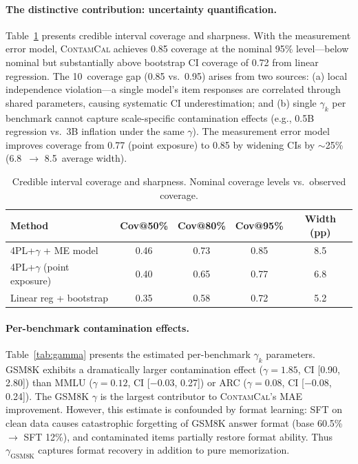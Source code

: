 \documentclass[11pt,a4paper]{article}
\newcommand{\method}{\textsc{ContamCal}}
\newcommand{\pp}{\,\text{pp}}
\begin{document}
\paragraph{The distinctive contribution: uncertainty quantification.}
Table~\ref{tab:coverage} presents credible interval coverage and sharpness. With the measurement error model, \method{} achieves 0.85 coverage at the nominal 95\% level---below nominal but substantially above bootstrap CI coverage of 0.72 from linear regression. The 10\pp{} coverage gap (0.85 vs.\ 0.95) arises from two sources: (a) local independence violation---a single model's item responses are correlated through shared parameters, causing systematic CI underestimation; and (b) single $\gamma_k$ per benchmark cannot capture scale-specific contamination effects (e.g., 0.5B regression vs.\ 3B inflation under the same $\gamma$). The measurement error model improves coverage from 0.77 (point exposure) to 0.85 by widening CIs by $\sim$25\% (6.8\pp{} $\to$ 8.5\pp{} average width).

\begin{table}[t]
\centering
\caption{Credible interval coverage and sharpness. Nominal coverage levels vs.\ observed coverage.}
\label{tab:coverage}
\small
\begin{tabular}{lcccc}
\toprule
\textbf{Method} & \textbf{Cov@50\%} & \textbf{Cov@80\%} & \textbf{Cov@95\%} & \textbf{Width (pp)} \\
\midrule
4PL+$\gamma$ + ME model        & 0.46 & 0.73 & 0.85 & 8.5 \\
4PL+$\gamma$ (point exposure)  & 0.40 & 0.65 & 0.77 & 6.8 \\
Linear reg + bootstrap          & 0.35 & 0.58 & 0.72 & 5.2 \\
\bottomrule
\end{tabular}
\end{table}

\paragraph{Per-benchmark contamination effects.}
Table~\ref{tab:gamma} presents the estimated per-benchmark $\gamma_k$ parameters. GSM8K exhibits a dramatically larger contamination effect ($\gamma = 1.85$, CI [0.90, 2.80]) than MMLU ($\gamma = 0.12$, CI [$-0.03$, 0.27]) or ARC ($\gamma = 0.08$, CI [$-0.08$, 0.24]). The GSM8K $\gamma$ is the largest contributor to \method{}'s MAE improvement. However, this estimate is confounded by format learning: SFT on clean data causes catastrophic forgetting of GSM8K answer format (base 60.5\% $\to$ SFT 12\%), and contaminated items partially restore format ability. Thus $\gamma_\text{GSM8K}$ captures format recovery in addition to pure memorization.
\end{document}
